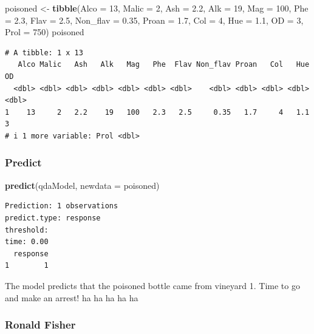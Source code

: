 \documentclass[
]{article}
\newenvironment{Shaded}{\begin{snugshade}}{\end{snugshade}}
\newcommand{\AttributeTok}[1]{\textcolor[rgb]{0.13,0.29,0.53}{#1}}
\newcommand{\DecValTok}[1]{\textcolor[rgb]{0.00,0.00,0.81}{#1}}
\newcommand{\FloatTok}[1]{\textcolor[rgb]{0.00,0.00,0.81}{#1}}
\newcommand{\FunctionTok}[1]{\textcolor[rgb]{0.13,0.29,0.53}{\textbf{#1}}}
\newcommand{\NormalTok}[1]{#1}
\newcommand{\OtherTok}[1]{\textcolor[rgb]{0.56,0.35,0.01}{#1}}
\begin{document}
\begin{Shaded}
\begin{Highlighting}[]
\NormalTok{poisoned }\OtherTok{\textless{}{-}} \FunctionTok{tibble}\NormalTok{(}\AttributeTok{Alco =} \DecValTok{13}\NormalTok{, }\AttributeTok{Malic =} \DecValTok{2}\NormalTok{, }\AttributeTok{Ash =} \FloatTok{2.2}\NormalTok{, }\AttributeTok{Alk =} \DecValTok{19}\NormalTok{, }\AttributeTok{Mag =} \DecValTok{100}\NormalTok{,}
                   \AttributeTok{Phe =} \FloatTok{2.3}\NormalTok{, }\AttributeTok{Flav =} \FloatTok{2.5}\NormalTok{, }\AttributeTok{Non\_flav =} \FloatTok{0.35}\NormalTok{, }\AttributeTok{Proan =} \FloatTok{1.7}\NormalTok{,}
                   \AttributeTok{Col =} \DecValTok{4}\NormalTok{, }\AttributeTok{Hue =} \FloatTok{1.1}\NormalTok{, }\AttributeTok{OD =} \DecValTok{3}\NormalTok{, }\AttributeTok{Prol =} \DecValTok{750}\NormalTok{)}
\NormalTok{poisoned}
\end{Highlighting}
\end{Shaded}

\begin{verbatim}
# A tibble: 1 x 13
   Alco Malic   Ash   Alk   Mag   Phe  Flav Non_flav Proan   Col   Hue    OD
  <dbl> <dbl> <dbl> <dbl> <dbl> <dbl> <dbl>    <dbl> <dbl> <dbl> <dbl> <dbl>
1    13     2   2.2    19   100   2.3   2.5     0.35   1.7     4   1.1     3
# i 1 more variable: Prol <dbl>
\end{verbatim}

\subsubsection{Predict}\label{predict}

\begin{Shaded}
\begin{Highlighting}[]
\FunctionTok{predict}\NormalTok{(qdaModel, }\AttributeTok{newdata =}\NormalTok{ poisoned)}
\end{Highlighting}
\end{Shaded}

\begin{verbatim}
Prediction: 1 observations
predict.type: response
threshold: 
time: 0.00
  response
1        1
\end{verbatim}

The model predicts that the poisoned bottle came from vineyard 1. Time
to go and make an arrest! ha ha ha ha ha

\subsubsection{Ronald Fisher}\label{ronald-fisher}
\end{document}
